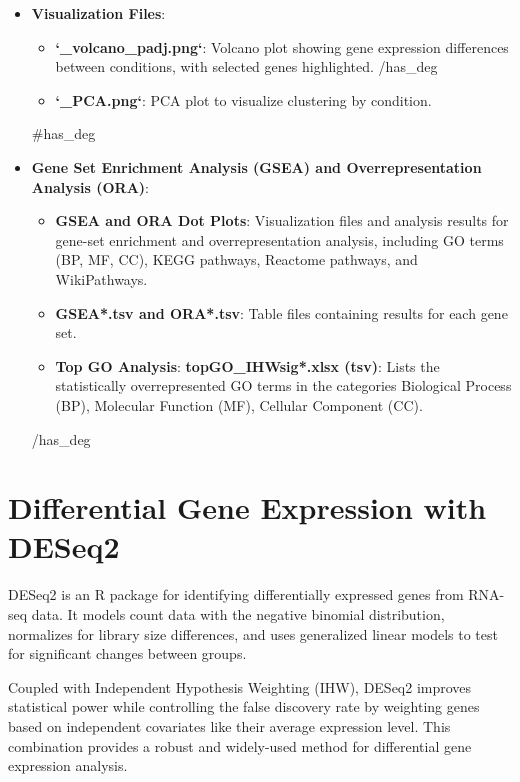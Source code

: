 \documentclass{article}
\begin{document}
\begin{itemize}
\begin{itemize}
    \end{itemize}
    {{/has_deg}}
    \item \textbf{Visualization Files}:
    \begin{itemize}
       {{#has_deg}}
        \item \textbf{`\textasteriskcentered{}\_volcano\_padj.png`}: Volcano plot showing gene expression differences between conditions, with selected genes highlighted.
        {{/has_deg}}
        \item \textbf{`\textasteriskcentered{}\_PCA.png`}: PCA plot to visualize clustering by condition.
    \end{itemize}
    {{#has_deg}}
    \item \textbf{Gene Set Enrichment Analysis (GSEA) and Overrepresentation Analysis (ORA)}:
    \begin{itemize}
        \item \textbf{GSEA and ORA Dot Plots}: Visualization files and analysis results for gene-set enrichment and overrepresentation analysis, including GO terms (BP, MF, CC), KEGG pathways, Reactome pathways, and WikiPathways.
        \item \textbf{GSEA*.tsv and ORA*.tsv}: Table files containing results for each gene set.
        \item \textbf{Top GO Analysis}:
        \textbf{topGO\_IHWsig*.xlsx (tsv)}: Lists the statistically overrepresented GO terms in the categories Biological Process (BP), Molecular Function (MF), Cellular Component (CC).
    \end{itemize}
    {{/has_deg}}

\end{itemize}

\pagebreak
\section*{Differential Gene Expression with DESeq2}

DESeq2 is an R package for identifying differentially expressed genes from RNA-seq data.
It models count data with the negative binomial distribution, normalizes for library size differences,
and uses generalized linear models to test for significant changes between groups.

Coupled with Independent Hypothesis Weighting (IHW), DESeq2 improves statistical power while controlling
the false discovery rate by weighting genes based on independent covariates like their average expression level.
This combination provides a robust and widely-used method for differential gene expression analysis.
\end{document}
